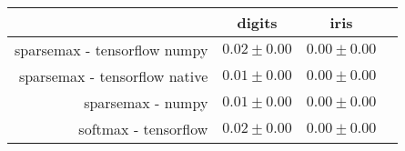 \begin{tabular}{r|ccc}
& digits & iris \\
\hline
sparsemax - tensorflow numpy & $0.02 \pm 0.00$ & $0.00 \pm 0.00$ \\
sparsemax - tensorflow native & $0.01 \pm 0.00$ & $0.00 \pm 0.00$ \\
sparsemax - numpy & $0.01 \pm 0.00$ & $0.00 \pm 0.00$ \\
softmax - tensorflow & $0.02 \pm 0.00$ & $0.00 \pm 0.00$ \\
\end{tabular}
